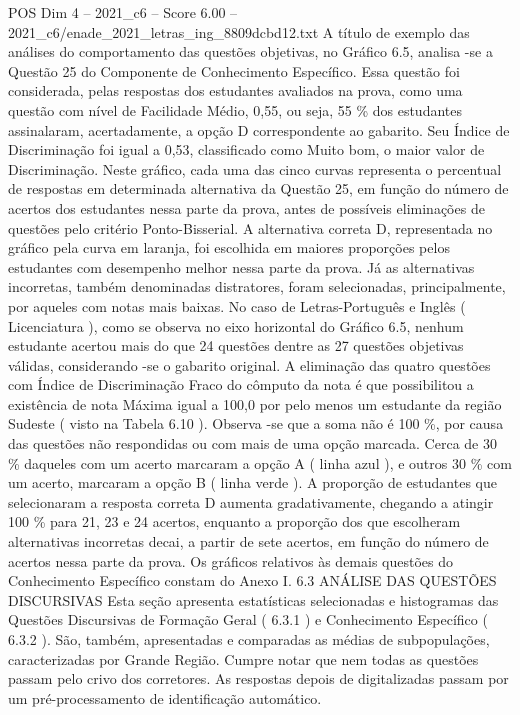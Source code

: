 \begin{textsample}{POS Dim 4 – 2021\_c6 – Score 6.00 – 2021\_c6/enade\_2021\_letras\_ing\_8809dcbd12.txt}
A título de exemplo das análises do comportamento das questões objetivas, no Gráfico 6.5, analisa -se a Questão 25 do Componente de Conhecimento Específico.
Essa questão foi considerada, pelas respostas dos estudantes avaliados na prova, como uma questão com nível de Facilidade Médio, 0,55, ou seja, 55 \% dos estudantes assinalaram, acertadamente, a opção D correspondente ao gabarito.
Seu Índice de Discriminação foi igual a 0,53, classificado como Muito bom, o maior valor de Discriminação.
Neste gráfico, cada uma das cinco curvas representa o percentual de respostas em determinada alternativa da Questão 25, em função do número de acertos dos estudantes nessa parte da prova, antes de possíveis eliminações de questões pelo critério Ponto-Bisserial.
A alternativa correta D, representada no gráfico pela curva em laranja, foi escolhida em maiores proporções pelos estudantes com desempenho melhor nessa parte da prova.
Já as alternativas incorretas, também denominadas distratores, foram selecionadas, principalmente, por aqueles com notas mais baixas.
No caso de Letras-Português e Inglês ( Licenciatura ), como se observa no eixo horizontal do Gráfico 6.5, nenhum estudante acertou mais do que 24 questões dentre as 27 questões objetivas válidas, considerando -se o gabarito original.
A eliminação das quatro questões com Índice de Discriminação Fraco do cômputo da nota é que possibilitou a existência de nota Máxima igual a 100,0 por pelo menos um estudante da região Sudeste ( visto na Tabela 6.10 ).
Observa -se que a soma não é 100 \%, por causa das questões não respondidas ou com mais de uma opção marcada.
Cerca de 30 \% daqueles com um acerto marcaram a opção A ( linha azul ), e outros 30 \% com um acerto, marcaram a opção B ( linha verde ).
A proporção de estudantes que selecionaram a resposta correta D aumenta gradativamente, chegando a atingir 100 \% para 21, 23 e 24 acertos, enquanto a proporção dos que escolheram alternativas incorretas decai, a partir de sete acertos, em função do número de acertos nessa parte da prova.
Os gráficos relativos às demais questões do Conhecimento Específico constam do Anexo I. 6.3 ANÁLISE DAS QUESTÕES DISCURSIVAS Esta seção apresenta estatísticas selecionadas e histogramas das Questões Discursivas de Formação Geral ( 6.3.1 ) e Conhecimento Específico ( 6.3.2 ).
São, também, apresentadas e comparadas as médias de subpopulações, caracterizadas por Grande Região.
Cumpre notar que nem todas as questões passam pelo crivo dos corretores.
As respostas depois de digitalizadas passam por um pré-processamento de identificação automático.

\end{textsample}
